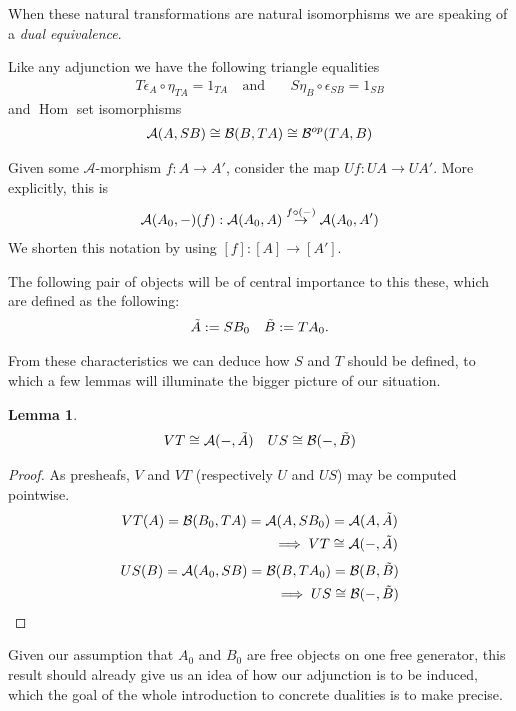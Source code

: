 \documentclass[12pt,a4paper]{article}
\newtheorem{lemma}{Lemma}[section] %
\DeclareMathOperator{\Hom}{Hom}
\def\HomA{\ensuremath\mathcal{A}}
\def\HomB{\ensuremath\mathcal{B}}
\def\t{\ensuremath\tilde}
\begin{document}
When these natural transformations are natural isomorphisms we are speaking of a \emph{dual equivalence}. 

Like any adjunction we have the following triangle equalities \begin{align*}
	&T{\epsilon_A} \circ \eta_{TA} = 1_{TA} \ &\text{and}& \ &  S{\eta_B} \circ \epsilon_{SB} = 1_{SB}&
\end{align*}
and $\Hom$ set isomorphisms \begin{align*}
	\HomA(A, SB) \cong \HomB(B, TA) \cong \HomB^{op}(TA,B)
\end{align*}

Given some $\mathcal{A}$-morphism $f: A\to A'$, consider the map $Uf: UA \to UA'$. More explicitly, this is \begin{align*}
 	\HomA(A_0, -) (f) : \HomA(A_0, A) \stackrel{f \circ (-)}{\to} \HomA(A_0, A')
 \end{align*}
We shorten this notation by using $[f]: [A] \to [A']$.

The following pair of objects will be of central importance to this these, which are defined as the following:
\begin{align*}
	\t A := SB_0&&
	\t B := TA_0.
\end{align*}


From these characteristics we can deduce how $S$ and $T$ should be defined, to which a few lemmas will illuminate the bigger picture of our situation.
\begin{lemma}
\begin{align*}
		VT \cong \HomA(-, \t  A)&&
	US \cong \HomB(-, \t  B)\\
\end{align*}
\end{lemma}
\begin{proof}
As presheafs, $V$ and $VT$ (respectively $U$ and $US$) may be computed pointwise. 
\begin{align*}
	VT(A) = \HomB(B_0, TA) = \HomA(A,SB_0) = \HomA(A, \t A) \\
	\implies VT \cong \HomA(-, \t A)
\end{align*}
\begin{align*}
	US(B) = \HomA(A_0, SB) = \HomB(B,TA_0) = \HomB(B, \t B) \\
	\implies US \cong \HomB(-, \t B)
\end{align*}
\end{proof}

Given our assumption that $A_0$ and $B_0$ are free objects on one free generator, this result should already give us an idea of how our adjunction is to be induced, which the goal of the whole introduction to concrete dualities is to make precise. 
\end{document}
